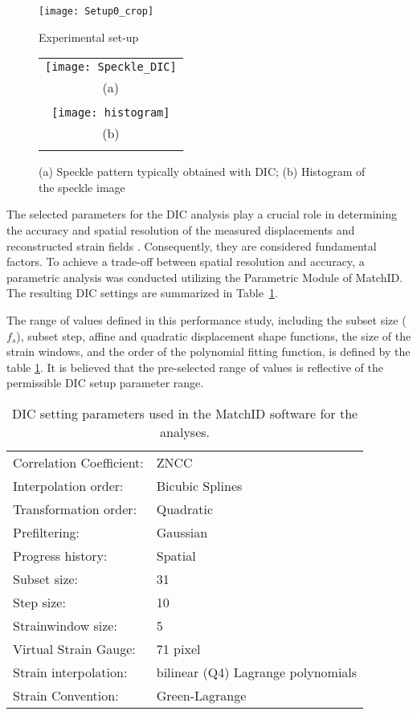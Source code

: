 \begin{figure}[htp]
	\centering
	\texttt{[image: Setup0\_crop]}
	\caption{Experimental set-up}
	\label{fig:Setup0°}
\end{figure}


\begin{figure}[htp]
	\centering
	\begin{tabular}{c}
		\texttt{[image: Speckle\_DIC]} \\
		(a) \\
		\\
		\texttt{[image: histogram]} \\
		(b) \\
		\\
	\end{tabular}
	\caption{(a) Speckle pattern typically obtained with DIC; (b) Histogram of the speckle image}
	\label{fig:Speckle_DIC}
\end{figure}


The selected parameters for the DIC analysis play a crucial role in determining the accuracy and spatial resolution of the measured displacements and reconstructed strain fields \citep{Xavier2012207,PereiraandXavier2018}. Consequently, they are considered fundamental factors. To achieve a trade-off between spatial resolution and accuracy, a parametric analysis was conducted utilizing the Parametric Module of MatchID. The resulting DIC settings are summarized in Table~\ref{tab:MatchID_param}.

The range of values defined in this performance study, including the subset size ($f_s$), subset step, affine and quadratic displacement shape functions, the size of the strain windows, and the order of the polynomial fitting function, is defined by the table \ref{tab:MatchID_param}. It is believed that the pre-selected range of values is reflective of the permissible DIC setup parameter range.

\begin{table}[]
	\centering
	\begin{tabular}{m{}m{}}\toprule
		Correlation   Coefficient: & ZNCC \\
		Interpolation order: & Bicubic Splines \\ 
		Transformation order: & Quadratic \\
		Prefiltering: & Gaussian \\
		Progress history: & Spatial \\
		Subset size: & 31 \\
		Step size: & 10 \\
		Strainwindow size: & 5 \\ 
		Virtual Strain Gauge: & 71 pixel \\
		Strain interpolation: & bilinear (Q4) Lagrange polynomials\\
		Strain Convention: & Green-Lagrange \\\bottomrule
	\end{tabular}
	\caption{DIC setting parameters used in the MatchID software for the analyses.}
	\label{tab:MatchID_param}
\end{table}


